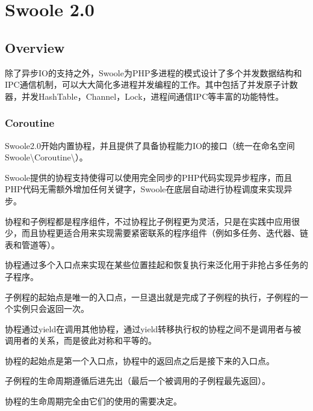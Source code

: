 \part{Swoole 2.0}

\chapter{Overview}

除了异步IO的支持之外，Swoole为PHP多进程的模式设计了多个并发数据结构和IPC通信机制，可以大大简化多进程并发编程的工作。其中包括了并发原子计数器，并发HashTable，Channel，Lock，进程间通信IPC等丰富的功能特性。


\section{Coroutine}


Swoole2.0开始内置协程，并且提供了具备协程能力IO的接口（统一在命名空间Swoole\textbackslash Coroutine\textbackslash *）。

Swoole提供的协程支持使得可以使用完全同步的PHP代码实现异步程序，而且PHP代码无需额外增加任何关键字，Swoole在底层自动进行协程调度来实现异步。


协程和子例程都是程序组件，不过协程比子例程更为灵活，只是在实践中应用很少，而且协程更适合用来实现需要紧密联系的程序组件（例如多任务、迭代器、链表和管道等）。


\begin{compactitem}
\item 协程通过多个入口点来实现在某些位置挂起和恢复执行来泛化用于非抢占多任务的子程序。
\item 子例程的起始点是唯一的入口点，一旦退出就是完成了子例程的执行，子例程的一个实例只会返回一次。
\end{compactitem}



协程通过yield在调用其他协程，通过yield转移执行权的协程之间不是调用者与被调用者的关系，而是彼此对称和平等的。

协程的起始点是第一个入口点，协程中的返回点之后是接下来的入口点。

\begin{compactitem}
\item 子例程的生命周期遵循后进先出（最后一个被调用的子例程最先返回）。
\item 协程的生命周期完全由它们的使用的需要决定。
\end{compactitem}






